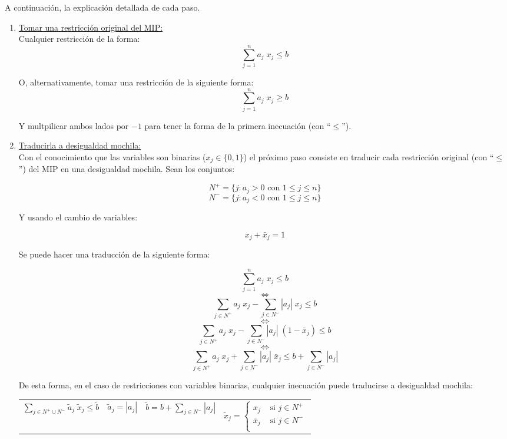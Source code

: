 A continuación, la explicación detallada de cada paso.
\newpage

\begin{enumerate}[ 1{)} ]
\item \underline{Tomar una restricción original del MIP:}\\
Cualquier restricción de la forma:
$$\overset{n}{\underset{j=1}{\sum}} a_j\;x_j \leq b$$

O, alternativamente, tomar una restricción de la siguiente forma:
$$\overset{n}{\underset{j=1}{\sum}} a_j\;x_j \geq b$$

Y multpilicar ambos lados por $-1$ para tener la forma de la primera inecuación (con ``$\leq$'').

\item \underline{Traducirla a desigualdad mochila:}\\
Con el conocimiento que las variables son binarias ($x_j\in\{0,1\}$) el próximo paso consiste en traducir cada restricción original (con ``$\leq$'') del MIP en una desigualdad mochila. Sean los conjuntos:

$$N^+ = \{j: a_j > 0 \text{ con } 1\leq j \leq n\}$$
$$N^- = \{j: a_j < 0 \text{ con } 1\leq j \leq n\}$$

Y usando el cambio de variables:

$$x_j + \bar{x}_j = 1$$

Se puede hacer una traducción de la siguiente forma:

$$\overset{n}{\underset{j=1}{\sum}} a_j\;x_j \leq b$$
$$\Leftrightarrow$$
$$\overset{}{\underset{j \in N^+}{\sum}} a_j\;x_j - \overset{}{\underset{j \in N^-}{\sum}} |a_j|\;x_j \leq b$$
$$\Leftrightarrow$$
$$\overset{}{\underset{j \in N^+}{\sum}} a_j\;x_j - \overset{}{\underset{j \in N^-}{\sum}} |a_j|\;(1-\bar{x}_j) \leq b$$
$$\Leftrightarrow$$
$$\overset{}{\underset{j \in N^+}{\sum}} a_j\;x_j + \overset{}{\underset{j \in N^-}{\sum}} |a_j|\;\bar{x}_j \leq b + \overset{}{\underset{j \in N^-}{\sum}} |a_j|$$

De esta forma, en el caso de restricciones con variables binarias, cualquier inecuación puede traducirse a desigualdad mochila:

{
\centering
\begin{tabular}{p{4cm}p{2cm}p{3cm}p{4cm}}
$\overset{}{\underset{j \in N^+ \cup N^-}{\sum}} \tilde{a}_j\;\tilde{x}_j \leq \tilde{b}$
&
$\tilde{a}_j = |a_j|$
&
$\tilde{b} = b + \overset{}{\underset{j \in N^-}{\sum}} |a_j|$
&
$\tilde{x}_j = 
\begin{cases}
x_j & \text{ si } j \in N^+\\
\bar{x}_j & \text{ si } j \in N^-\\
\end{cases}$\\
\end{tabular}\\
\vspace{5mm}
}


\end{enumerate}
